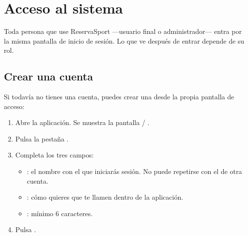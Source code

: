 
\section{Acceso al sistema}
\label{sec:acceso}

Toda persona que use ReservaSport —usuario final o administrador— entra por
la misma pantalla de inicio de sesión. Lo que ve después de entrar depende
de su rol.

\subsection{Crear una cuenta}
\label{sec:acceso:crear-cuenta}

Si todavía no tienes una cuenta, puedes crear una desde la propia pantalla
de acceso:

\begin{enumerate}
  \item Abre la aplicación. Se muestra la pantalla  /
        .
  \item Pulsa la pestaña .
  \item Completa los tres campos:
        \begin{itemize}
          \item {}: el nombre con el que iniciarás sesión.
                No puede repetirse con el de otra cuenta.
          \item {}: cómo quieres que te llamen dentro
                de la aplicación.
          \item {}: mínimo 6 caracteres.
        \end{itemize}
  \item Pulsa .
\end{enumerate}




